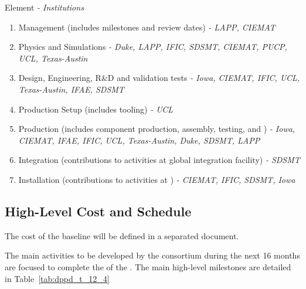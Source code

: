  Element \textit{- Institutions} \\
\begin{enumerate}
\item Management \dual {} (includes milestones and review dates) \textit{- LAPP, CIEMAT }
\item Physics and Simulations \textit{- Duke, LAPP, IFIC, SDSMT, CIEMAT, PUCP, UCL, Texas-Austin}
\item Design, Engineering, R\&D and validation tests \textit{- Iowa, CIEMAT, IFIC, UCL, Texas-Austin, IFAE, SDSMT}
\item Production Setup (includes tooling) \textit{- UCL}
\item Production (includes component production, assembly, testing, and ) \textit{- Iowa, CIEMAT, IFAE, IFIC, UCL, Texas-Austin, Duke, SDSMT, LAPP}
\item Integration (contributions to activities at global integration facility) \textit{- SDSMT}
\item Installation (contributions to activities at \surf) \textit{- CIEMAT, IFIC, SDSMT, Iowa}
\end{enumerate}


\subsection{High-Level Cost and Schedule}
\label{sec:fddp-pd-12.4}

The cost of the baseline \dual  {} will be defined in a separated document.

The main activities to be developed by the \dual {} consortium during the next \num{16} months are focused to complete the  of the \dual {}. The main high-level milestones are detailed in Table~\ref{tab:dppd_t_12_4}

